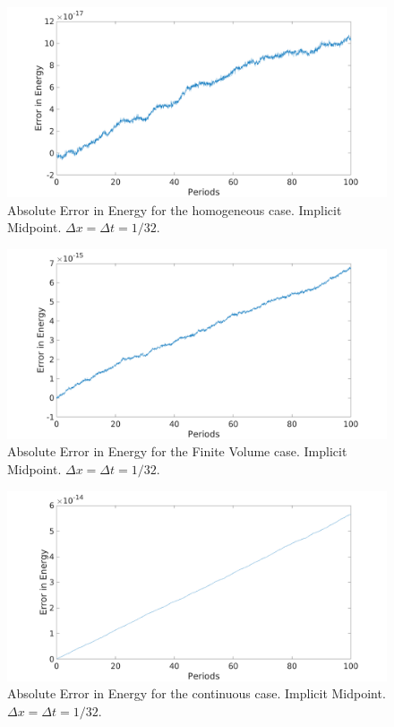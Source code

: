 \documentclass{article}
\begin{document}
\begin{figure}
\centering
\includegraphics[width=\textwidth]{32Method0.png}
\caption{Absolute Error in Energy for the homogeneous case. Implicit Midpoint. $\Delta x = \Delta t = 1/32$.} 
\label{fig:abserrhom}
\end{figure}
\begin{figure}
\centering
\includegraphics[width=\textwidth]{32Method1.png}
\caption{Absolute Error in Energy for the Finite Volume case. Implicit Midpoint. $\Delta x = \Delta t = 1/32$.} 
\label{fig:abserrFV}
\end{figure}
\begin{figure}
\centering
\includegraphics[width=\textwidth]{32Method2.png}
\caption{Absolute Error in Energy for the continuous case. Implicit Midpoint. $\Delta x = \Delta t = 1/32$.} 
\label{fig:abserrcon}
\end{figure}
\end{document}
